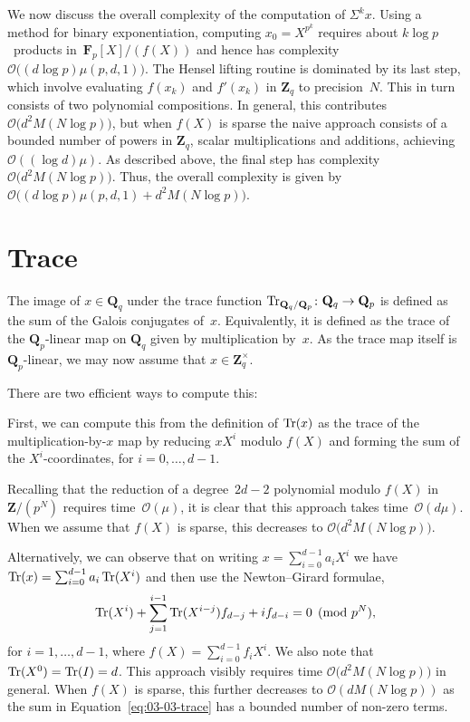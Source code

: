 We now discuss the overall complexity of the computation of $\Sigma^k x$.
Using a method for binary exponentiation, computing \mbox{$x_0 = X^{p^k}$} 
requires about $k \log p$~products in~$\mathbf{F}_p[X] / (f(X))$ and hence 
has complexity $\mathcal{O}\bigl((d \log p) \mu(p,d,1)\bigr)$.  The Hensel 
lifting routine is dominated by its last step, which involve evaluating 
$f(x_k)$ and $f'(x_k)$ in $\mathbf{Z}_q$ to precision~$N$.  This in turn 
consists of two polynomial compositions.  In general, this contributes 
$\mathcal{O}\bigl(d^2 M(N \log p)\bigr)$, but when $f(X)$ is sparse 
the naive approach consists of a bounded number of powers in $\mathbf{Z}_q$, 
scalar multiplications and additions, achieving $\mathcal{O}((\log d) \mu)$.  
As described above, the final step has complexity 
$\mathcal{O}\bigl(d^2 M(N \log p)\bigr)$.  Thus, the overall complexity 
is given by $\mathcal{O}\bigl( (d \log p) \mu(p,d,1) + d^2 M(N \log p) \bigr)$.

\section{Trace}

The image of $x \in \mathbf{Q}_q$ under the trace function 
$\operatorname{Tr}_{\mathbf{Q}_q/\mathbf{Q}_p} \colon \mathbf{Q}_q \rightarrow \mathbf{Q}_p$ 
is defined as the sum of the Galois conjugates of~$x$.  Equivalently, 
it is defined as the trace of the $\mathbf{Q}_p$-linear map on 
$\mathbf{Q}_q$ given by multiplication by~$x$.  As the trace map 
itself is $\mathbf{Q}_p$-linear, we may now assume that 
$x \in \mathbf{Z}_q^{\times}$.

There are two efficient ways to compute this:

First, we can compute this from the definition of $\operatorname{Tr}(x)$ as the trace 
of the multiplication-by-$x$ map by reducing $x X^i$ modulo $f(X)$ and forming 
the sum of the $X^i$-coordinates, for $i = 0, \dotsc, d - 1$.

Recalling that the reduction of a degree~$2d-2$ polynomial modulo 
$f(X)$ in $\mathbf{Z}/(p^N)$ requires time~$\mathcal{O}(\mu)$, 
it is clear that this approach takes time~$\mathcal{O}(d \mu)$. 
When we assume that $f(X)$ is sparse, this decreases to 
$\mathcal{O}\bigl(d^2 M(N \log p)\bigr)$.

Alternatively, we can observe that on writing $x = \sum_{i=0}^{d-1} a_i X^i$ 
we have $\operatorname{Tr}(x) = \sum_{i=0}^{d-1} a_i \operatorname{Tr}(X^i)$ and then use the 
Newton--Girard formulae,
\begin{equation} \label{eq:03-03-trace}
\operatorname{Tr}(X^i) + \sum_{j=1}^{i-1} \operatorname{Tr}(X^{i-j}) f_{d-j} + i f_{d-i} = 0 \pmod{p^N}, 
\end{equation}
for $i = 1, \dotsc, d-1$, where $f(X) = \sum_{i=0}^{d-1} f_i X^i$.  
We also note that $\operatorname{Tr}(X^0) = \operatorname{Tr}(I) = d$.  This approach visibly 
requires time $\mathcal{O}\bigl(d^2 M(N \log p)\bigr)$ in general.  When 
$f(X)$ is sparse, this further decreases to $\mathcal{O}(d M(N \log p))$ as 
the sum in Equation~\eqref{eq:03-03-trace} has a bounded number of 
non-zero terms.

